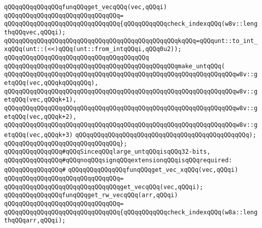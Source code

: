 \newline
\verb|qQQqqQQqqQQqqQQqfunqQQqget_vecqQQq(vec,qQQqi)|\newline
\verb|qQQqqQQqqQQqqQQqqQQqqQQqqQQqqQQq=|\newline
\verb|qQQqqQQqqQQqqQQqqQQqqQQqqQQqqQQq{qQQqqQQqqQQqcheck_indexqQQq(w8v::lengthqQQqvec,qQQqi);|\newline
\newline
\verb|qQQqqQQqqQQqqQQqqQQqqQQqqQQqqQQqqQQqqQQqqQQqqQQqkqQQq=qQQqunt::to_int_xqQQq(unt::(<<)qQQq(unt::from_intqQQqi,qQQq0u2));|\newline
\verb|qQQqqQQqqQQqqQQqqQQqqQQqqQQqqQQqqQQqqQQq|\newline
\verb|qQQqqQQqqQQqqQQqqQQqqQQqqQQqqQQqqQQqqQQqqQQqqQQqmake_untqQQq(|\newline
\verb|qQQqqQQqqQQqqQQqqQQqqQQqqQQqqQQqqQQqqQQqqQQqqQQqqQQqqQQqqQQqqQQqw8v::getqQQq(vec,qQQqkqQQqqQQq),|\newline
\verb|qQQqqQQqqQQqqQQqqQQqqQQqqQQqqQQqqQQqqQQqqQQqqQQqqQQqqQQqqQQqqQQqw8v::getqQQq(vec,qQQqk+1),|\newline
\verb|qQQqqQQqqQQqqQQqqQQqqQQqqQQqqQQqqQQqqQQqqQQqqQQqqQQqqQQqqQQqqQQqw8v::getqQQq(vec,qQQqk+2),|\newline
\verb|qQQqqQQqqQQqqQQqqQQqqQQqqQQqqQQqqQQqqQQqqQQqqQQqqQQqqQQqqQQqqQQqw8v::getqQQq(vec,qQQqk+3)|\newline
\verb|qQQqqQQqqQQqqQQqqQQqqQQqqQQqqQQqqQQqqQQqqQQqqQQq);|\newline
\verb|qQQqqQQqqQQqqQQqqQQqqQQqqQQqqQQq};|\newline
\newline
\verb|qQQqqQQqqQQqqQQq#qQQqSinceqQQqlarge_untqQQqisqQQq32-bits,|\newline
\verb|qQQqqQQqqQQqqQQq#qQQqnoqQQqsignqQQqextensionqQQqisqQQqrequired:|\newline
\verb|qQQqqQQqqQQqqQQq#|\newline
\verb|qQQqqQQqqQQqqQQqfunqQQqget_vec_xqQQq(vec,qQQqi)|\newline
\verb|qQQqqQQqqQQqqQQqqQQqqQQqqQQqqQQq=|\newline
\verb|qQQqqQQqqQQqqQQqqQQqqQQqqQQqqQQqget_vecqQQq(vec,qQQqi);|\newline
\newline
\verb|qQQqqQQqqQQqqQQqfunqQQqget_rw_vecqQQq(arr,qQQqi)|\newline
\verb|qQQqqQQqqQQqqQQqqQQqqQQqqQQqqQQq=|\newline
\verb|qQQqqQQqqQQqqQQqqQQqqQQqqQQqqQQq{qQQqqQQqqQQqcheck_indexqQQq(w8a::lengthqQQqarr,qQQqi);|\newline
